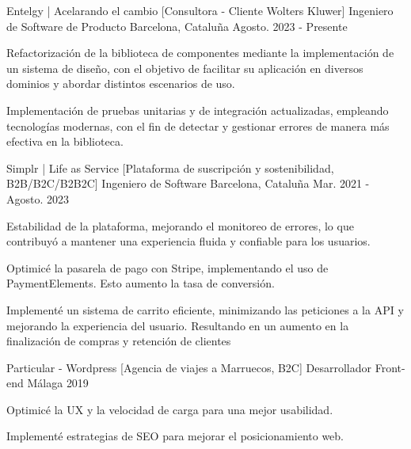 
\begin{cventries}
    \cventry
    {Entelgy | Acelarando el cambio [Consultora - Cliente Wolters Kluwer]}
    {Ingeniero de Software de Producto}
    {Barcelona, Cataluña}
    {Agosto. 2023 - Presente}
    {
    \begin{cvitems}
        \item{Refactorización de la biblioteca de componentes mediante la implementación de un sistema de diseño, con el objetivo de facilitar su aplicación en diversos dominios y abordar distintos escenarios de uso.}
        \item{Implementación de pruebas unitarias y de integración actualizadas, empleando tecnologías modernas, con el fin de detectar y gestionar errores de manera más efectiva en la biblioteca.}
    \end{cvitems}
    }
    \cventry
    {Simplr | Life as Service [Plataforma de suscripción y sostenibilidad, B2B/B2C/B2B2C]}
    {Ingeniero de Software}
    {Barcelona, Cataluña}
    {Mar. 2021 - Agosto. 2023}
    {
    \begin{cvitems}
        \item{Estabilidad de la plataforma, mejorando el monitoreo de errores, lo que contribuyó a mantener una experiencia fluida y confiable para los usuarios.}
        \item{Optimicé la pasarela de pago con Stripe, implementando el uso de PaymentElements. Esto aumento la tasa de conversión.}
        \item{Implementé un sistema de carrito eficiente, minimizando las peticiones a la API y mejorando la experiencia del usuario. Resultando en un aumento en la finalización de compras y retención de clientes}
    \end{cvitems}
    }

    \cventry
    {Particular - Wordpress [Agencia de viajes a Marruecos, B2C]}
    {Desarrollador Front-end}
    {Málaga}
    {2019}
    {
    \begin{cvitems}
        \item{Optimicé la UX y la velocidad de carga para una mejor usabilidad.}
        \item{Implementé estrategias de SEO para mejorar el posicionamiento web.}
    \end{cvitems}
    }


\end{cventries}
